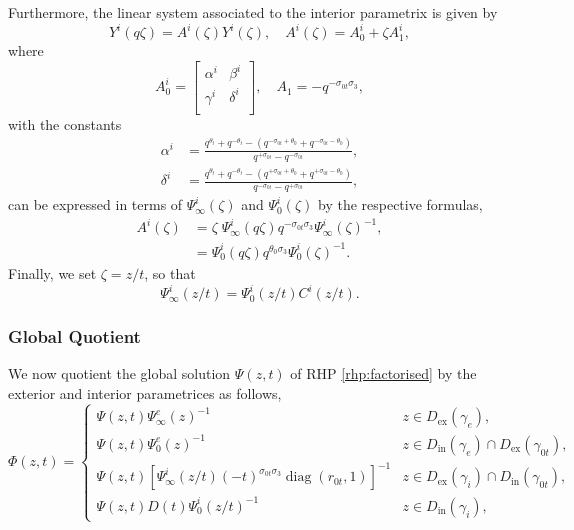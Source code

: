\documentclass[a4paper,reqno,11pt]{amsart}
\numberwithin{equation}{section}
\numberwithin{figure}{section}
\theoremstyle{plain}
\theoremstyle{remark}
\newcounter{rhp}
\numberwithin{rhp}{section}
\begin{document}
Furthermore, the linear system associated to the interior parametrix is given by
\begin{equation}\label{eq:internal_linear_system}
    Y^i(q\zeta)=A^i(\zeta)Y^i(\zeta),\quad A^i(\zeta)=A_0^i+\zeta A_1^i,
\end{equation}
where
\begin{equation*}
    A_0^i=\begin{bmatrix}
    \alpha^i & \beta^i\\
    \gamma^i& \delta^i\\
    \end{bmatrix},\quad
      A_1=-q^{-\sigma_{0t} \sigma_3},
\end{equation*}
with the constants
\begin{align*}
     \alpha^i&=\frac{q^{\theta_t}+q^{-\theta_t}-(q^{-\sigma_{0t}+\theta_0}+q^{-\sigma_{0t}-\theta_0})}{q^{+\sigma_{0t}}-q^{-\sigma_{0t}}},\\
     \delta^i&=\frac{q^{\theta_t}+q^{-\theta_t}-(q^{+\sigma_{0t}+\theta_0}+q^{+\sigma_{0t}-\theta_0})}{q^{-\sigma_{0t}}-q^{+\sigma_{0t}}},
\end{align*}
can be expressed in terms of $\Psi_\infty^i(\zeta)$ and $\Psi_0^i(\zeta)$ by the respective formulas,
\begin{align*}
    A^i(\zeta)&=\zeta\;\Psi_\infty^i(q\zeta)q^{-\sigma_{0t} \sigma_3}\Psi_\infty^i(\zeta)^{-1},\\
&=\Psi_0^i(q\zeta)q^{\theta_0\sigma_3}\Psi_0^i(\zeta)^{-1}.
\end{align*}
Finally,  we set $\zeta=z/t$, so that
\begin{equation*}
   \Psi_\infty^i(z/t)= \Psi_0^i(z/t)C^i(z/t).
\end{equation*}




   
\subsubsection{Global Quotient}
We now quotient the global solution $\Psi(z,t)$ of RHP \ref{rhp:factorised} by the exterior and interior parametrices as follows,
\begin{equation}\label{def:Phi}
\Phi(z,t)=\begin{cases}
    \Psi(z,t)\Psi_\infty^e(z)^{-1} & z\in D_{\text{ex}}(\gamma_e),\\
    \Psi(z,t)\Psi_0^e(z)^{-1} & z\in D_{\text{in}}(\gamma_e)\cap D_{\text{ex}}(\gamma_{0t}),\\
    \Psi(z,t)[\Psi_\infty^i(z/t)(-t)^{\sigma_{0t}\sigma_3} \operatorname{diag}(r_{0t},1)]^{-1} & z\in D_{\text{ex}}(\gamma_i)\cap D_{\text{in}}(\gamma_{0t}),\\
    \Psi(z,t)D(t)\Psi_0^i(z/t)^{-1} & z\in D_{\text{in}}(\gamma_i),
\end{cases}
\end{equation}
\end{document}
